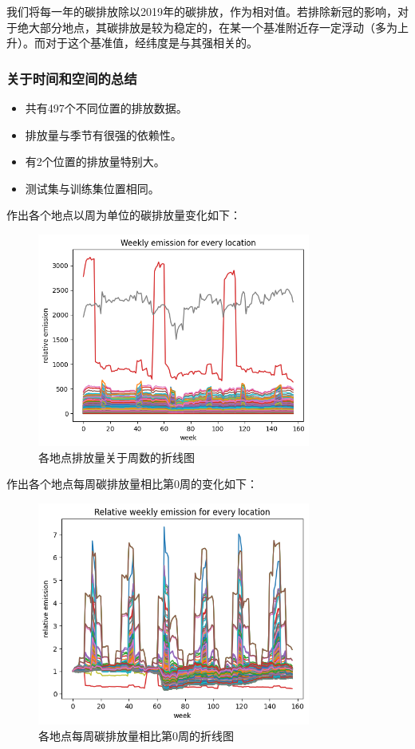 \documentclass{ctexart}
\begin{document}
我们将每一年的碳排放除以2019年的碳排放，作为相对值。若排除新冠的影响，对于绝大部分地点，其碳排放是较为稳定的，在某一个基准附近存一定浮动（多为上升）。而对于这个基准值，经纬度是与其强相关的。

\subsubsection{关于时间和空间的总结}

\begin{itemize}
      \item 共有497个不同位置的排放数据。
      \item 排放量与季节有很强的依赖性。
      \item 有2个位置的排放量特别大。
      \item 测试集与训练集位置相同。
\end{itemize}

作出各个地点以周为单位的碳排放量变化如下：

\begin{figure}[H]
      \centering
      \includegraphics[width=0.8\textwidth]{output8.png}
      \caption{各地点排放量关于周数的折线图}
\end{figure}

作出各个地点每周碳排放量相比第0周的变化如下：

\begin{figure}[H]
      \centering
      \includegraphics[width=0.8\textwidth]{output6.png}
      \caption{各地点每周碳排放量相比第0周的折线图}
\end{figure}
\end{document}

